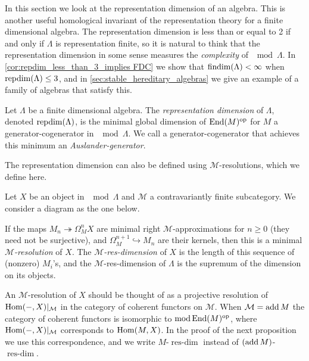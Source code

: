 
In this section we look at the representation dimension of an algebra. This is another useful homological invariant of the representation theory for a finite dimensional algebra. The representation dimension is less than or equal to 2 if and only if $\Lambda$ is representation finite, so it is natural to think that the representation dimension in some sense measures the \textit{complexity} of $\mod\Lambda$. In \cref{cor:repdim_less_than_3_implies FDC} we show that $\operatorname{findim}(\Lambda) < \infty$ when $\operatorname{repdim}(\Lambda) \leq 3$, and in \cref{sec:stable_hereditary_algebras} we give an example of a family of algebras that satisfy this.

\begin{defn}
	Let $\Lambda$ be a finite dimensional algebra. The \emph{representation dimension} of $\Lambda$, denoted $\operatorname{repdim}(\Lambda)$, is the minimal global dimension of $\operatorname{End}(M)^{\operatorname{op}}$ for $M$ a generator-cogenerator in $\mod\Lambda$. We call a generator-cogenerator that achieves this minimum an \emph{Auslander-generator}.
\end{defn}

The representation dimension can also be defined using $\mathcal M$-resolutions, which we define here.

\begin{defn}
	Let $X$ be an object in $\mod\Lambda$ and $\mathcal M$ a contravariantly finite subcategory. We consider a diagram as the one below.
	\begin{center}
	\end{center}
	If the maps $M_n \twoheadrightarrow \Omega_M^nX$ are minimal right $\mathcal M$-approximations for $n\geq 0$ (they need not be surjective), and $\Omega_M^{n+1} \hookrightarrow M_n$ are their kernels, then this is a minimal \emph{$\mathcal M$-resolution} of $X$. The \emph{$\mathcal M$-res-dimension} of $X$ is the length of this sequence of (nonzero) $M_i$'s, and the $\mathcal M$-res-dimension of $\Lambda$ is the supremum of the dimension on its objects.
\end{defn}

An $\mathcal M$-resolution of $X$ should be thought of as a projective resolution of $\operatorname{Hom}(-, X)|_{\mathcal M}$ in the category of coherent functors on $\mathcal M$. When $\mathcal M = \operatorname{add} M$ the category of coherent functors is isomorphic to $\operatorname{mod} \operatorname{End}(M)^{\operatorname{op}}$, where $\operatorname{Hom}(-, X)|_{\mathcal M}$ corresponds to $\operatorname{Hom}(M, X)$. In the proof of the next proposition we use this correspondence, and we write $M$-$\operatorname{res-dim}$ instead of $(\operatorname{add} M)$-$\operatorname{res-dim}$. 

